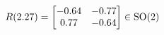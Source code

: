 \documentclass[preview]{standalone}
\begin{document}
\begin{align*}
\special{dvisvgm:raw <g id='unique000'>}R(2.27) = \begin{bmatrix} -0.64 & -0.77 \\ 0.77 & -0.64 \end{bmatrix} \in \text{SO}(2)\special{dvisvgm:raw </g>}
\end{align*}
\end{document}
